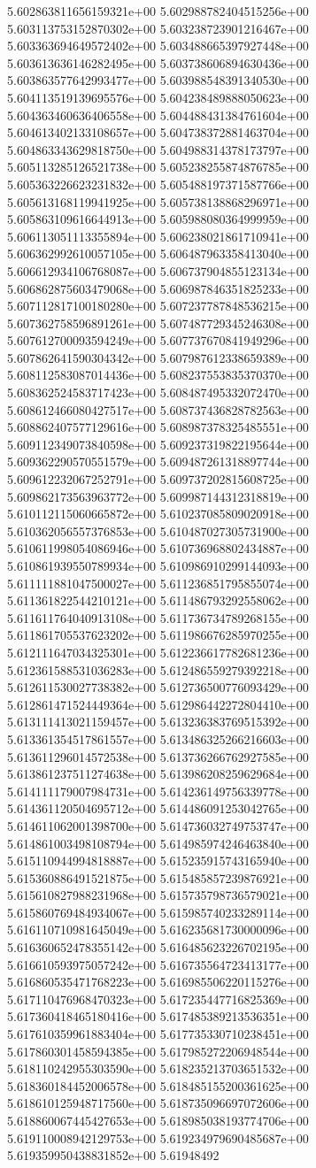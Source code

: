 	5.602863811656159321e+00	5.602988782404515256e+00	5.603113753152870302e+00	5.603238723901216467e+00	5.603363694649572402e+00	5.603488665397927448e+00	5.603613636146282495e+00	5.603738606894630436e+00	5.603863577642993477e+00	5.603988548391340530e+00	5.604113519139695576e+00	5.604238489888050623e+00	5.604363460636406558e+00	5.604488431384761604e+00	5.604613402133108657e+00	5.604738372881463704e+00	5.604863343629818750e+00	5.604988314378173797e+00	5.605113285126521738e+00	5.605238255874876785e+00	5.605363226623231832e+00	5.605488197371587766e+00	5.605613168119941925e+00	5.605738138868296971e+00	5.605863109616644913e+00	5.605988080364999959e+00	5.606113051113355894e+00	5.606238021861710941e+00	5.606362992610057105e+00	5.606487963358413040e+00	5.606612934106768087e+00	5.606737904855123134e+00	5.606862875603479068e+00	5.606987846351825233e+00	5.607112817100180280e+00	5.607237787848536215e+00	5.607362758596891261e+00	5.607487729345246308e+00	5.607612700093594249e+00	5.607737670841949296e+00	5.607862641590304342e+00	5.607987612338659389e+00	5.608112583087014436e+00	5.608237553835370370e+00	5.608362524583717423e+00	5.608487495332072470e+00	5.608612466080427517e+00	5.608737436828782563e+00	5.608862407577129616e+00	5.608987378325485551e+00	5.609112349073840598e+00	5.609237319822195644e+00	5.609362290570551579e+00	5.609487261318897744e+00	5.609612232067252791e+00	5.609737202815608725e+00	5.609862173563963772e+00	5.609987144312318819e+00	5.610112115060665872e+00	5.610237085809020918e+00	5.610362056557376853e+00	5.610487027305731900e+00	5.610611998054086946e+00	5.610736968802434887e+00	5.610861939550789934e+00	5.610986910299144093e+00	5.611111881047500027e+00	5.611236851795855074e+00	5.611361822544210121e+00	5.611486793292558062e+00	5.611611764040913108e+00	5.611736734789268155e+00	5.611861705537623202e+00	5.611986676285970255e+00	5.612111647034325301e+00	5.612236617782681236e+00	5.612361588531036283e+00	5.612486559279392218e+00	5.612611530027738382e+00	5.612736500776093429e+00	5.612861471524449364e+00	5.612986442272804410e+00	5.613111413021159457e+00	5.613236383769515392e+00	5.613361354517861557e+00	5.613486325266216603e+00	5.613611296014572538e+00	5.613736266762927585e+00	5.613861237511274638e+00	5.613986208259629684e+00	5.614111179007984731e+00	5.614236149756339778e+00	5.614361120504695712e+00	5.614486091253042765e+00	5.614611062001398700e+00	5.614736032749753747e+00	5.614861003498108794e+00	5.614985974246463840e+00	5.615110944994818887e+00	5.615235915743165940e+00	5.615360886491521875e+00	5.615485857239876921e+00	5.615610827988231968e+00	5.615735798736579021e+00	5.615860769484934067e+00	5.615985740233289114e+00	5.616110710981645049e+00	5.616235681730000096e+00	5.616360652478355142e+00	5.616485623226702195e+00	5.616610593975057242e+00	5.616735564723413177e+00	5.616860535471768223e+00	5.616985506220115276e+00	5.617110476968470323e+00	5.617235447716825369e+00	5.617360418465180416e+00	5.617485389213536351e+00	5.617610359961883404e+00	5.617735330710238451e+00	5.617860301458594385e+00	5.617985272206948544e+00	5.618110242955303590e+00	5.618235213703651532e+00	5.618360184452006578e+00	5.618485155200361625e+00	5.618610125948717560e+00	5.618735096697072606e+00	5.618860067445427653e+00	5.618985038193774706e+00	5.619110008942129753e+00	5.619234979690485687e+00	5.619359950438831852e+00	5.61948492